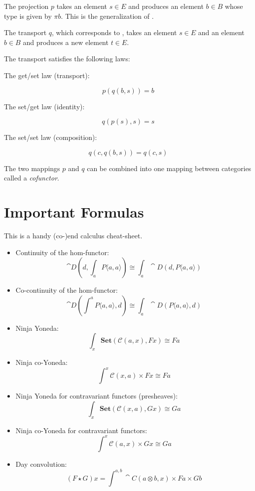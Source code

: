 \documentclass[DaoFP]{subfiles}
\begin{document}
The projection $p$ takes an element $s \in E$ and produces an element $b \in B$ whose type is given by $\pi b$. This is the generalization of . 

The transport $q$, which corresponds to , takes an element $s \in E$ and an element $b \in B$ and produces a new element $t \in E$. 


The transport satisfies the following laws:

The get/set law (transport):

\[ p (q (b, s)) = b \]

The set/get law (identity):

\[ q ( p (s), s) = s \]

The set/set law (composition):

\[ q (c, q (b, s)) = q (c, s) \]

The two mappings $p$ and $q$ can be combined into one mapping between categories called a \emph{cofunctor}. 
\section{Important Formulas}
This is a handy (co-)end calculus cheat-sheet.
\begin{itemize}
\item Continuity of the hom-functor:
\[\cat D\left(d, \int_a P\langle a, a \rangle \right) \cong \int_a \cat D \left(d, P\langle a, a \rangle \right) \]
\item Co-continuity of the hom-functor:
\[\cat D\left( \int^a P\langle a, a \rangle , d \right) \cong \int_a \cat D \left( P\langle a, a \rangle, d \right) \]
\item Ninja Yoneda:
\[ \int_{x} \mathbf{Set} (\mathcal{C}(a, x), F x) \cong F a \]
\item Ninja co-Yoneda:
\[ \int^{x} \mathcal{C}(x, a) \times F x \cong F a \]
\item Ninja Yoneda for contravariant functors (presheaves):
\[ \int_{x} \mathbf{Set} (\mathcal{C}(x, a), G x) \cong G a \]
\item Ninja co-Yoneda for contravariant functors:
\[ \int^{x} \mathcal{C}(a, x) \times G x \cong G a \]
\item Day convolution:
\[ (F \star G) x = \int^{a, b} \cat C (a \otimes b, x) \times F a \times G b \]

\end{itemize}
\end{document}
